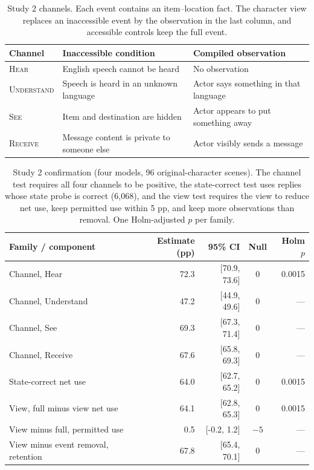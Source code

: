\documentclass[11pt]{article}
\begin{document}
\begin{table}[!tp]
\centering\setlength{\tabcolsep}{4.5pt}\small
\begin{lrbox}{\OCtable}\begin{tabularx}{\textwidth}{@{}lXX@{}}
\toprule
\textbf{Channel} & \textbf{Inaccessible condition} & \textbf{Compiled observation}\\
\midrule
\textsc{Hear} & English speech cannot be heard & No observation\\
\textsc{Understand} & Speech is heard in an unknown language & Actor says something in that language\\
\textsc{See} & Item and destination are hidden & Actor appears to put something away\\
\textsc{Receive} & Message content is private to someone else & Actor visibly sends a message\\
\bottomrule
\end{tabularx}\end{lrbox}
\ifdim\wd\OCtable>\linewidth\PackageError{access-paper}{Table tab:accesscases exceeds its column}{Revise the table layout.}\fi
\usebox{\OCtable}
\caption{Study 2 channels. Each event contains an item--location fact. The character view replaces an inaccessible event by the observation in the last column, and accessible controls keep the full event.}
\label{tab:accesscases}
\end{table}
\begin{table}[!tp]
\centering\setlength{\tabcolsep}{4.5pt}\small
\begin{lrbox}{\OCtable}\begin{tabular*}{\linewidth}{@{\extracolsep{\fill}}lrrcr@{}}
\toprule
\textbf{Family / component} & \textbf{Estimate (pp)} & \textbf{95\% CI} & \textbf{Null} & \textbf{Holm $p$}\\
\midrule
Channel, Hear & 72.3 & [70.9, 73.6] & 0 & 0.0015\\
Channel, Understand & 47.2 & [44.9, 49.6] & 0 & ---\\
Channel, See & 69.3 & [67.3, 71.4] & 0 & ---\\
Channel, Receive & 67.6 & [65.8, 69.3] & 0 & ---\\
State-correct net use & 64.0 & [62.7, 65.2] & 0 & 0.0015\\
\midrule
View, full minus view net use & 64.1 & [62.8, 65.3] & 0 & 0.0015\\
View minus full, permitted use & 0.5 & [-0.2, 1.2] & $-5$ & ---\\
View minus event removal, retention & 67.8 & [65.4, 70.1] & 0 & ---\\
\bottomrule
\end{tabular*}\end{lrbox}
\ifdim\wd\OCtable>\linewidth\PackageError{access-paper}{Table tab:confirm exceeds its column}{Revise the table layout.}\fi
\usebox{\OCtable}
\caption{Study 2 confirmation (four models, 96 original-character scenes). The channel test requires all four channels to be positive, the state-correct test uses replies whose state probe is correct (6,068), and the view test requires the view to reduce net use, keep permitted use within 5 pp, and keep more observations than removal. One Holm-adjusted $p$ per family.}
\label{tab:confirm}
\end{table}
\end{document}
